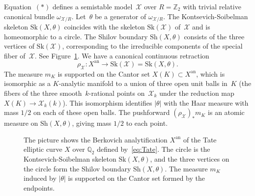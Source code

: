 \documentclass[11pt]{article}
\newcommand{\smaller}{\small}
\theoremstyle{definition}
\numberwithin{equation}{subsection}
\newcommand{\Z}{\ensuremath{\mathbb{Z}}}
\newcommand{\Q}{\ensuremath{\mathbb{Q}}}
\newcommand{\cX}{\ensuremath{\mathscr{X}}}
\newcommand{\an}{\mathrm{an}}
\newcommand{\Sh}{\mathrm{Sh}}
\newcommand{\Sk}{\mathrm{Sk}}
\let\form\theta
\begin{document}
Equation~$(*)$ defines a semistable model~$\cX$ over $R=\Z_2$ with trivial relative canonical bundle $\omega_{\cX/R}$. Let~$\form$ be a generator of
$\omega_{\cX/R}$.
The Kontsevich-Soibelman skeleton $\Sk(X,\form)$ coincides with the skeleton $\Sk(\cX)$ of~$\cX$ and is homeomorphic to a circle. The Shilov boundary $\Sh(X,\form)$ consists of the three vertices of $\Sk(\cX)$,
corresponding to the irreducible components of the special fiber of~$\cX$. See Figure~\ref{F101}. We have a canonical continuous retraction
\[
\rho_{\cX}\colon X^{\an}\to \Sk(\cX)=\Sk(X,\form).
\]
The measure $m_K$ is supported on the Cantor set $X(K)\subset X^{\an}$, which is isomorphic as a $K$\nobreakdash-analytic manifold to a union of three open unit balls in~$K$ (the fibers of the three smooth~$k$-rational points on~$\cX_k$ under the reduction map $X(K)\to \cX_k(k)$). This isomorphism identifies $|\form|$ with the Haar measure with mass $1/2$ on each of these open balls.
The pushforward $(\rho_{\cX})_*m_K$ is an atomic measure on $\Sh(X,\form)$, giving mass $1/2$ to each point.
\begin{figure}[ht]
\centering
{}
\caption{\smaller The picture shows the Berkovich analytification $X^{\an}$ of the Tate elliptic curve $X$ over $\Q_2$ defined by~\eqref{eq:Tate}. The circle is the Kontsevich-Soibelman skeleton $\Sk(X,\form)$, and the three vertices on the circle form the Shilov boundary $\Sh(X,\form)$. The measure $m_K$ induced by $|\form|$ is supported on the Cantor set formed by the endpoints.}\label{F101}
\end{figure}
\end{document}
